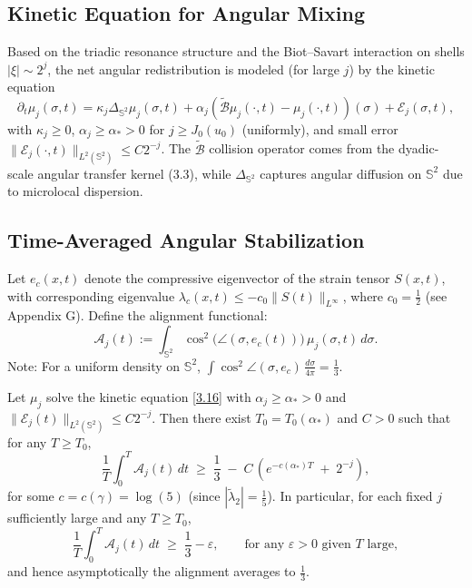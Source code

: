\documentclass[11pt]{article}
\begin{document}
\subsection{Kinetic Equation for Angular Mixing}

Based on the triadic resonance structure and the Biot--Savart interaction on shells $|\xi| \sim 2^j$, the net angular redistribution is modeled (for large $j$) by the kinetic equation
\begin{equation}
\partial_t \mu_j(\sigma, t) = \kappa_j \Delta_{\mathbb{S}^2} \mu_j(\sigma, t) 
+ \alpha_j \left( \tilde{\mathcal{B}} \mu_j(\cdot, t) - \mu_j(\cdot, t) \right)(\sigma) 
+ \mathcal{E}_j(\sigma, t), \tag{3.16}
\end{equation}
with $\kappa_j \geq 0$, $\alpha_j \geq \alpha_*>0$ for $j \geq J_0(u_0)$ (uniformly), and small error $\|\mathcal{E}_j(\cdot, t)\|_{L^2(\mathbb{S}^2)} \leq C 2^{-j}$. The $\tilde{\mathcal{B}}$ collision operator comes from the dyadic-scale angular transfer kernel (3.3), while $\Delta_{\mathbb{S}^2}$ captures angular diffusion on $\mathbb{S}^2$ due to microlocal dispersion. 

\subsection{Time-Averaged Angular Stabilization}

Let $e_c(x,t)$ denote the compressive eigenvector of the strain tensor $S(x,t)$, with corresponding eigenvalue $\lambda_c(x,t) \leq - c_0 \|S(t)\|_{L^\infty}$, where $c_0 = \frac{1}{2}$ (see Appendix G). Define the alignment functional:
\[
\mathcal{A}_j(t) := \int_{\mathbb{S}^2} \cos^2\big(\angle(\sigma, e_c(t))\big) \, \mu_j(\sigma, t) \, d\sigma. \tag{3.17}
\]
Note: For a uniform density on $\mathbb{S}^2$, $\int \cos^2 \angle(\sigma, e_c)\, \frac{d\sigma}{4\pi} = \frac{1}{3}$.

\begin{theorem} \label{thm:stabilization}
Let $\mu_j$ solve the kinetic equation \eqref{3.16} with $\alpha_j \geq \alpha_* > 0$ and $\|\mathcal{E}_j(t)\|_{L^2(\mathbb{S}^2)} \leq C 2^{-j}$. Then there exist $T_0 = T_0(\alpha_*)$ and $C > 0$ such that for any $T \geq T_0$,
\[
\frac{1}{T} \int_0^T \mathcal{A}_j(t) \, dt \;\geq\; \frac{1}{3} \;-\; C \, \left( e^{ - c (\alpha_*) T } \;+\; 2^{-j} \right), \tag{3.18}
\]
for some $c = c(\gamma) = \log(5)$ (since $|\tilde{\lambda}_2| = \frac{1}{5}$). In particular, for each fixed $j$ sufficiently large and any $T \geq T_0$, 
\[
\frac{1}{T} \int_0^T \mathcal{A}_j(t)\, dt \;\geq\; \frac{1}{3} - \varepsilon, \qquad \text{for any $\varepsilon > 0$ given $T$ large}, \tag{3.19}
\]
and hence asymptotically the alignment averages to $\frac{1}{3}$.
\end{theorem}
\end{document}
